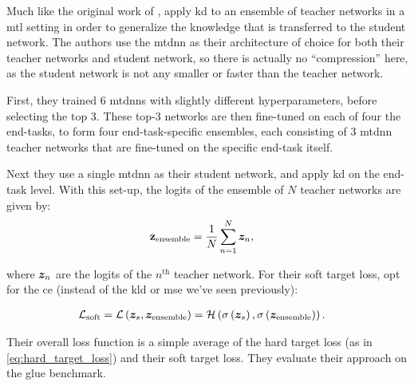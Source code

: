 Much like the original work of \citet{bucil2006model}, \citet{liu2019improving} apply \gls{kd} to an ensemble of teacher networks in a \gls{mtl} setting in order to generalize the knowledge that is transferred to the student network. The authors use the \gls{mtdnn} \citep{liu2019multi} as their architecture of choice for both their teacher networks and student network, so there is actually no ``compression'' here, as the student network is not any smaller or faster than the teacher network.

First, they trained 6 \glspl{mtdnn} with slightly different hyperparameters, before selecting the top 3. These top-3 networks are then fine-tuned on each of four the end-tasks, to form four end-task-specific ensembles, each consisting of 3 \gls{mtdnn} teacher networks that are fine-tuned on the specific end-task itself.

Next they use a single \gls{mtdnn} as their student network, and apply \gls{kd} on the end-task level. With this set-up, the logits of the ensemble of $N$ teacher networks are given by:
\begin{align}
    \vect{z}_{\text{ensemble}} &= \frac{1}{N} \sum_{n=1}^N \vect{z}_n,
\end{align}

where $\vect{z}_n$ are the logits of the $n^{\text{th}}$ teacher network. For their soft target loss, \citet{liu2019improving} opt for the \gls{ce} (instead of the \gls{kld} or \gls{mse} we've seen previously):

\begin{align}
    \mathcal{L}_{\text{soft}} = \loss{\vect{z}_s, \vect{z}_{\text{ensemble}}} &= \ce{\softmax{\vect{z}_s}, \softmax{\vect{z}_{\text{ensemble}}}}.
\end{align}

Their overall loss function is a simple average of the hard target loss (as in \cref{eq:hard_target_loss}) and their soft target loss. They evaluate their approach on the \gls{glue} benchmark.

